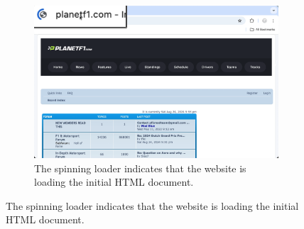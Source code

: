\begin{figure}[htbp]
    \centering
    \begin{subfigure}[b]{0.48\textwidth}
        \centering
        \includegraphics[width=\textwidth]{media/screen_load.png}
        \caption{The spinning loader indicates that the website is loading the initial HTML document.}
        \label{fig:screen-load}
    \end{subfigure}
    
    \vspace{1em}
    

\end{figure}
